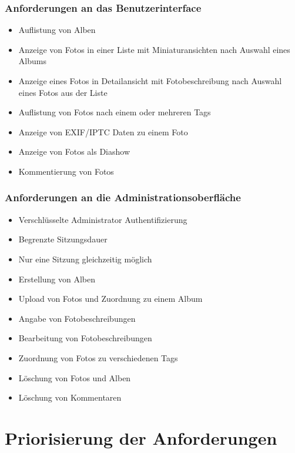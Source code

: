 \documentclass[a4paper,12pt,liststotocnumbered]{scrartcl}
\begin{document}
\subsubsection{Anforderungen an das Benutzerinterface}

\begin{itemize}
	\item Auflistung von Alben
	\item Anzeige von Fotos in einer Liste mit Miniaturansichten nach
		Auswahl eines Albums
	\item Anzeige eines Fotos in Detailansicht mit Fotobeschreibung nach
		Auswahl eines Fotos aus der Liste
	\item Auflistung von Fotos nach einem oder mehreren Tags
	\item Anzeige von EXIF/IPTC Daten zu einem Foto
	\item Anzeige von Fotos als Diashow
	\item Kommentierung von Fotos
\end{itemize}

\subsubsection{Anforderungen an die Administrationsoberfläche}

\begin{itemize}
	\item Verschlüsselte Administrator Authentifizierung
	\item Begrenzte Sitzungsdauer
	\item Nur eine Sitzung gleichzeitig möglich
	\item Erstellung von Alben
	\item Upload von Fotos und Zuordnung zu einem Album
	\item Angabe von Fotobeschreibungen
	\item Bearbeitung von Fotobeschreibungen
	\item Zuordnung von Fotos zu verschiedenen Tags
	\item Löschung von Fotos und Alben
	\item Löschung von Kommentaren
\end{itemize}

\newpage

\section{Priorisierung der Anforderungen}
\end{document}
